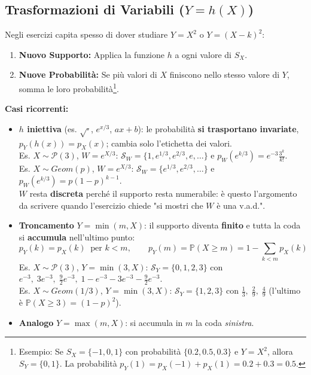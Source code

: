 \documentclass[12pt]{extarticle} %
\begin{document}
\subsection{Trasformazioni di Variabili ($Y = h(X)$)}
Negli esercizi capita spesso di dover studiare $Y = X^2$ o $Y = (X-k)^2$:
\begin{enumerate}
    \item \textbf{Nuovo Supporto:} Applica la funzione $h$ a ogni valore di $S_X$.
    \item \textbf{Nuove Probabilità:} Se più valori di $X$ finiscono nello stesso valore di $Y$, somma le loro probabilità\footnote{Esempio: Se $S_X = \{-1, 0, 1\}$ con probabilità $\{0.2, 0.5, 0.3\}$ e $Y = X^2$, allora $S_Y = \{0, 1\}$. La probabilità $p_Y(1) = p_X(-1) + p_X(1) = 0.2 + 0.3 = 0.5$.}.
\end{enumerate}
\textbf{Casi ricorrenti:}
\begin{itemize}
    \item \textbf{$h$ iniettiva} (es. $\sqrt{\cdot}$, $e^{x/3}$, $ax+b$): le probabilità \textbf{si trasportano invariate}, $p_Y(h(x)) = p_X(x)$; cambia solo l'etichetta dei valori. \\ {\footnotesize Es. $X \sim \mathcal{P}(3)$, $W = e^{X/3}$: $\mathcal{S}_W = \{1, e^{1/3}, e^{2/3}, e, \dots\}$ e $p_W(e^{k/3}) = e^{-3}\frac{3^k}{k!}$. \\ Es. $X \sim Geom(p)$, $W = e^{X/3}$: $\mathcal{S}_W = \{e^{1/3}, e^{2/3}, \dots\}$ e $p_W(e^{k/3}) = p(1-p)^{k-1}$. \\ $W$ resta \textbf{discreta} perché il supporto resta numerabile: è questo l'argomento da scrivere quando l'esercizio chiede "si mostri che $W$ è una v.a.d.".}
    \item \textbf{Troncamento} $Y = \min(m, X)$: il supporto diventa \textbf{finito} e tutta la coda si \textbf{accumula} nell'ultimo punto:
    $$ p_Y(k) = p_X(k) \;\; \text{per } k < m, \qquad p_Y(m) = \mathbb{P}(X \ge m) = 1 - \sum_{k<m} p_X(k) $$
    {\footnotesize Es. $X \sim \mathcal{P}(3)$, $Y = \min(3,X)$: $\mathcal{S}_Y = \{0,1,2,3\}$ con $e^{-3},\; 3e^{-3},\; \frac92 e^{-3},\; 1 - e^{-3} - 3e^{-3} - \frac92 e^{-3}$. \\ Es. $X \sim Geom(1/3)$, $Y = \min(3,X)$: $\mathcal{S}_Y = \{1,2,3\}$ con $\frac13,\; \frac29,\; \frac49$ (l'ultimo è $\mathbb{P}(X \ge 3) = (1-p)^2$).}
    \item \textbf{Analogo} $Y = \max(m,X)$: si accumula in $m$ la coda \emph{sinistra}.
\end{itemize}
\end{document}
